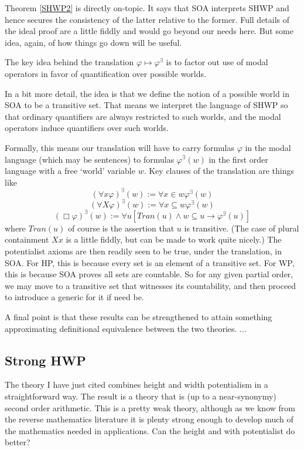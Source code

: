 \documentclass{article}
\begin{document}
Theorem \ref{SHWP2} is directly on-topic. It says that SOA interprets SHWP and hence
secures the consistency of the latter relative to the former. Full details of the 
ideal proof are a little fiddly and would go beyond our needs here. But some idea, 
again, of how things go down will be useful.

The key idea behind the translation $\varphi \mapsto \varphi^\exists$ is to factor 
out use of modal operators in favor of quantification over possible worlds. 

In a bit more detail, the idea is that we define the notion of a possible world 
in SOA to be a transitive set. That means we interpret the language of SHWP so that ordinary 
quantifiers are always restricted to such worlds, and the modal operators induce 
quantifiers over such worlds. 

Formally, this means our translation will have to 
carry formulas $\varphi$ in the modal language (which may be sentences) to formulas 
$\varphi^\exists(w)$ 
in the first order language with a free `world' variable $w$. Key clauses of the 
translation are things like
\[ (\forall x \varphi)^\exists(w) := \forall x \in w \varphi^\exists(w) \]
\[ (\forall X \varphi)^\exists(w) := \forall x \subseteq w \varphi^\exists(w) \]
\[ (\Box \varphi)^\exists(w) := \forall u [Tran(u) \wedge w \subseteq u \rightarrow \varphi^\exists(u)]\]
where $Tran(u)$ of course is the assertion that $u$ is transitive. (The case of 
plural containment $Xx$ is a little fiddly, but can be made to work quite nicely.)
The potentialist axioms are then readily seen to be true, under the translation, 
in SOA. For HP, this is because every set is an element of a transitive set. 
For WP, this is because SOA proves all sets are countable. So for any 
given partial order, we may move to a transitive set that witnesses its countability, 
and then proceed to introduce a generic for it if need be.

A final point is that these results can be strengthened to attain something 
approximating definitional equivalence between the two theories.  ...
\subsection{Strong HWP}
The theory I have just cited combines height and width potentialism in a 
straightforward way. The result is a theory that is (up to a near-synonymy) 
second order arithmetic. This is a pretty weak theory, although as we know 
from the reverse mathematics literature it is plenty strong enough to develop 
much of the mathematics needed in applications. Can the height and with potentialist 
do better?
\end{document}
